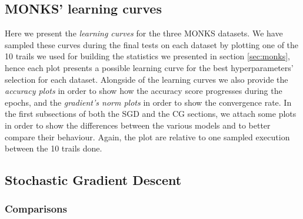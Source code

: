 \begin{appendices}
    \chapter{MONKS' learning curves} %
    \label{cha:monks_learning_curves}
        Here we present the \textit{learning curves} for the three MONKS datasets. We have sampled these curves
        during the final tests on each dataset by plotting one of the 10 trails we used for building the
        statistics we presented in section \ref{sec:monks}, hence each plot presents a possible learning curve
        for the best hyperparameters' selection for each dataset. Alongside of the learning curves
        we also provide the \textit{accuracy plots} in order to show how the accuracy score progresses
        during the epochs, and the \textit{gradient's norm plots} in order to show the convergence
        rate. In the first subsections of both the SGD and the CG sections, we attach some plots in order to show
        the differences between the various models and to better compare their behaviour. Again, the plot are
        relative to one sampled execution between the 10 trails done.

        \section{Stochastic Gradient Descent} %
        \label{sec:stochastic_gradient_descent}

            \subsection{Comparisons} %
            \label{sub:comparisons}


\end{appendices}
